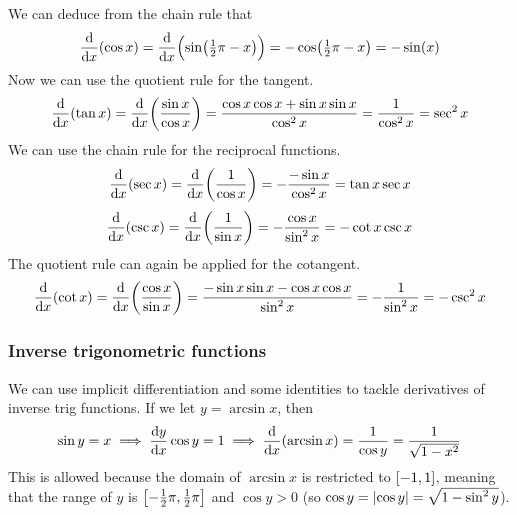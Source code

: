 We can deduce from the chain rule that
\begin{equation*}
\dv{x}(\cos x) = \dv{x}(\sin(\tfrac 12 \pi - x))
    = -\cos(\tfrac 12 \pi - x) = -\sin(x)
\end{equation*}
Now we can use the quotient rule for the tangent.
\begin{equation*}
\dv{x}(\tan x) = \dv{x}(\frac{\sin x}{\cos x})
    = \frac{\cos x \cos x + \sin x \sin x}{\cos^2 x}
    = \frac 1{\cos^2 x} = \sec^2 x
\end{equation*}
We can use the chain rule for the reciprocal functions.
\begin{equation*}
\dv{x}(\sec x) = \dv{x}(\frac 1{\cos x}) = -\frac{-\sin x}{\cos^2 x}
    = \tan x \sec x
\end{equation*}
\begin{equation*}
\dv{x}(\csc x) = \dv{x}(\frac 1{\sin x}) = -\frac{\cos x}{\sin^2 x}
    = -\cot x \csc x
\end{equation*}
The quotient rule can again be applied for the cotangent.
\begin{equation*}
\dv{x}(\cot x) = \dv{x}(\frac{\cos x}{\sin x})
    = \frac{-\sin x \sin x - \cos x \cos x}{\sin^2 x}
    = -\frac 1{\sin^2 x} = -\csc^2 x
\end{equation*}

\subsubsection{Inverse trigonometric functions} \label{sec_calc_trig_inv}

We can use implicit differentiation and some identities to tackle
derivatives of inverse trig functions. If we let \(y = \arcsin x\), then
\begin{equation*}
\sin y = x \implies \dv{y}{x} \cos y = 1
    \implies \dv{x}(\arcsin x) = \frac{1}{\cos y} = \frac{1}{\sqrt{1 - x^2}}
\end{equation*}
This is allowed because the domain of \(\arcsin x\) is restricted to
\(\intcc{-1, 1}\), meaning that the range of \(y\) is
\(\intcc{-\frac 12 \pi, \frac 12 \pi}\) and \(\cos y > 0\)
(so \(\cos y = \abs{\cos y} = \sqrt{1 - \sin^2 y}\)).

